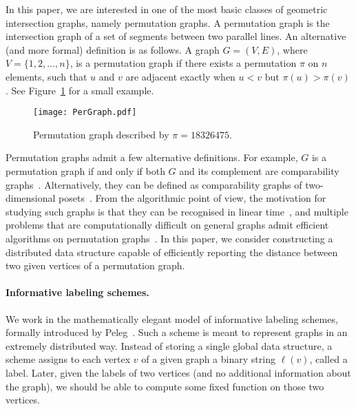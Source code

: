 \documentclass[a4paper,11pt]{article}
\begin{document}
In this paper, we are interested in one of the most basic classes of geometric intersection graphs, namely permutation
graphs. A permutation graph is the intersection graph of a set of segments between two parallel lines. An alternative
(and more formal) definition is as follows. A graph $G=(V,E)$, where $V=\{1,2,\ldots,n\}$, is a permutation graph if there
exists a permutation $\pi$ on $n$ elements, such that $u$ and $v$ are adjacent exactly when $u<v$ but $\pi(u)>\pi(v)$.
See Figure~\ref{Fig:PerGraph} for a small example.

\begin{figure}[h]
\begin{center}
  \texttt{[image: PerGraph.pdf]}
\end{center}
\caption{Permutation graph described by $\pi= 1 8 3 2 6 4 7 5$.}
\label{Fig:PerGraph}
\end{figure}

Permutation graphs admit a few alternative definitions. For example, $G$ is a permutation graph if and only if
both $G$ and its complement are comparability graphs~\cite{DBLP:journals/jacm/EvenPL72}. Alternatively, they can
be defined as comparability graphs of two-dimensional posets~\cite{DBLP:journals/networks/BakerFR72}.
From the algorithmic point of view, the motivation for studying such graphs is that they can be recognised in linear
time~\cite{McConnellS99}, and multiple problems that are computationally difficult on general graphs admit
efficient algorithms on permutation graphs~\cite{Moehring1985,CHAO2000159,Colbourn}.
In this paper, we consider constructing a distributed data structure capable of efficiently reporting the distance between
two given vertices of a permutation graph.

\paragraph{Informative labeling schemes. } We work in the mathematically elegant model of informative
labeling schemes, formally introduced by Peleg~\cite{Peleg05}. Such a scheme is meant to represent graphs in an extremely distributed way.
Instead of storing a single global data structure,
a scheme assigns to each vertex $v$ of a given graph a binary string $\ell(v)$, called a label.
Later, given the labels of two vertices (and no additional information about the graph), we should be able to compute
some fixed function on those two vertices.
\end{document}
